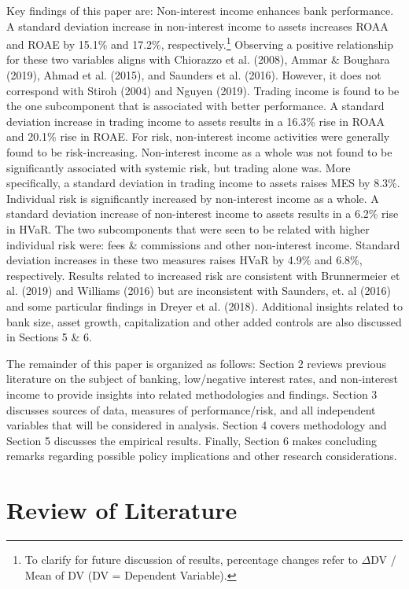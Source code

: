 \documentclass[10pt]{article} %
\begin{document}
Key findings of this paper are: Non-interest income enhances bank performance. A standard deviation increase in non-interest income to assets increases ROAA and ROAE by 15.1\% and 17.2\%, respectively.\footnote{To clarify for future discussion of results, percentage changes refer to $\Delta$DV / Mean of DV (DV = Dependent Variable).} Observing a positive relationship for these two variables aligns with Chiorazzo et al. (2008), Ammar \& Boughara (2019), Ahmad et al. (2015), and Saunders et al. (2016). However, it does not correspond with Stiroh (2004) and Nguyen (2019). Trading income is found to be the one subcomponent that is associated with better performance. A standard deviation increase in trading income to assets results in a 16.3\% rise in ROAA and 20.1\% rise in ROAE. For risk, non-interest income activities were generally found to be risk-increasing. Non-interest income as a whole was not found to be significantly associated with systemic risk, but trading alone was. More specifically, a standard deviation in trading income to assets raises MES by 8.3\%. Individual risk is significantly increased by non-interest income as a whole. A standard deviation increase of non-interest income to assets results in a 6.2\% rise in HVaR. The two subcomponents that were seen to be related with higher individual risk were: fees \& commissions and other non-interest income. Standard deviation increases in these two measures raises HVaR by 4.9\% and 6.8\%, respectively. Results related to increased risk are consistent with Brunnermeier et al. (2019) and Williams (2016) but are inconsistent with Saunders, et. al (2016) and some particular findings in Dreyer et al. (2018). Additional insights related to bank size, asset growth, capitalization and other added controls are also discussed in Sections 5 \& 6. 

The remainder of this paper is organized as follows: Section 2 reviews previous literature on the subject of banking, low/negative interest rates, and non-interest income to provide insights into related methodologies and findings. Section 3 discusses sources of data, measures of performance/risk, and all independent variables that will be considered in analysis. Section 4 covers methodology and Section 5 discusses the empirical results. Finally, Section 6 makes concluding remarks regarding possible policy implications and other research considerations. 
 
\section{Review of Literature}
\end{document}
